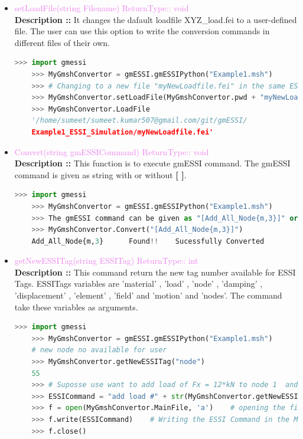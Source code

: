 \documentclass[11pt]{article}
\begin{document}
\begin{itemize}
    \item \textcolor{violet}{ setLoadFile(string Filename) \hfill {ReturnType:: void}} \\
    \textbf{Description ::} It changes the dafault loadfile XYZ\_load.fei to a user-defined file. The user can use this option to write the conversion commands in different files of their own.
    \begin{lstlisting}[language=Python]
    >>> import gmessi
    >>> MyGmshConvertor = gmESSI.gmESSIPython("Example1.msh")
    >>> # Changing to a new file "myNewLoadfile.fei" in the same ESSI_Simulation_Folder
    >>> MyGmshConvertor.setLoadFile(MyGmshConvertor.pwd + "myNewLoadfile.fei") 
    >>> MyGmshConvertor.LoadFile
    '/home/sumeet/sumeet.kumar507@gmail.com/git/gmESSI/
    Example1_ESSI_Simulation/myNewLoadfile.fei'
    \end{lstlisting}

    \item \textcolor{violet}{ Convert(string gmESSICommand) \hfill {ReturnType:: void}} \\
    \textbf{Description ::} This function is to execute gmESSI command. The gmESSI command is given as string with or without \textbf{[ ]}.
    \begin{lstlisting}[language=Python]
    >>> import gmessi
    >>> MyGmshConvertor = gmESSI.gmESSIPython("Example1.msh")
    >>> The gmESSI command can be given as "[Add_All_Node{m,3}]" or "Add_All_Node{m,3}"
    >>> MyGmshConvertor.Convert("[Add_All_Node{m,3}]")
    Add_All_Node{m,3}      Found!!    Sucessfully Converted
    \end{lstlisting}

    \item \textcolor{violet}{ getNewESSITag(string ESSITag) \hfill {ReturnType:: int}} \\
    \textbf{Description ::} This command return the new tag number available for ESSI Tags. ESSITags variables are 'material' , 'load' , 'node' , 'damping' , 'displacement' , 'element' , 'field'  and 'motion' and 'nodes'. The command take these variables as arguments.
    \begin{lstlisting}[language=Python]
    >>> import gmessi
    >>> MyGmshConvertor = gmESSI.gmESSIPython("Example1.msh")
    # new node no available for user
    >>> MyGmshConvertor.getNewESSITag("node")
    55
    >>> # Suposse use want to add load of Fx = 12*kN to node 1  and write it in mainfile
    >>> ESSICommand = "add load #" + str(MyGmshConvertor.getNewESSITag("load")) + " to node #1 type linear Fx= 10*kN; \n"
    >>> f = open(MyGmshConvertor.MainFile, 'a')    # opening the file in append mode
    >>> f.write(ESSICommand)    # Writing the ESSI Command in the Main XYZ_analysis.fei file
    >>> f.close()   
    \end{lstlisting}


\end{itemize}
\end{document}

